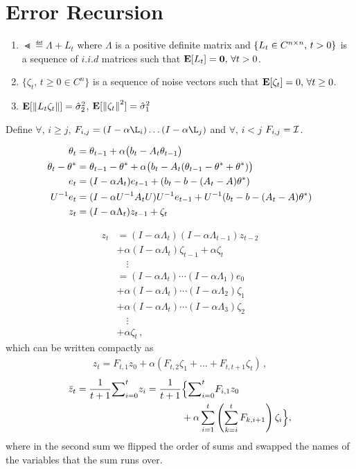 \section{Error Recursion}
\begin{assumption}\label{cmplxassmp}
\begin{enumerate}
\item $\Lt\eqdef \Lambda + L_t$ where $\Lambda$ is a positive definite matrix and $\{L_t \in C^{n\times n},\,t> 0\}$ is a sequence of $i.i.d$ matrices such that $\mathbf{E}[L_t]=\mathbf{0},\,\forall t>0$.
\item $\{\zeta_t,\,t\geq 0\in C^n\}$ is a sequence of noise vectors such that $\mathbf{E}[\zeta_t]=0,\,\forall t\geq 0$.
\item $\mathbf{E}[\left\| L_t \zeta_t\right\|]=\hat{\sigma}_2^2$, $\mathbf{E}[\left\| \zeta_t\right\|^2]=\hat{\sigma}_1^2$
\end{enumerate}
\end{assumption}

\begin{definition}
Define $\forall,\,i\geq j$, $F_{i,j}=(I-\alpha \L_i)\ldots (I-\alpha \L_j)$ and $\forall,\,i<j$ $F_{i,j}=\mathcal{I}$.
\end{definition}


\begin{align}
\theta_t&=\theta_{t-1}+\alpha\big(b_t-A_t\theta_{t-1}\big)\\
\theta_t-\theta^*&=\theta_{t-1}-\theta^*+\alpha\big(b_t-A_t(\theta_{t-1}-\theta^*+\theta^*)\big)\\
e_t&=(I-\alpha A_t)e_{t-1}+(b_t -b -(A_t-A)\theta^*)\\
U^{-1}e_t&=(I-\alpha U^{-1}A_t U) U^{-1}e_{t-1}+ U^{-1}(b_t -b -(A_t-A)\theta^*)\\
z_t&=(I-\alpha \Lambda_t) z_{t-1}+ \zeta_t
\end{align}


\begin{align*}
z_t
& = (I-\alpha \Lambda_t) (I-\alpha \Lambda_{t-1}) z_{t-2}\\ &+ \alpha (I-\alpha \Lambda_t) \zeta_{t-1} +\alpha \zeta_t \\
& \quad \vdots\\
& = (I-\alpha \Lambda_t) \cdots (I-\alpha \Lambda_1) e_0\\ &+ \alpha (I-\alpha \Lambda_t) \cdots (I-\alpha \Lambda_2) \zeta_1 \\
& + \alpha (I-\alpha \Lambda_t) \cdots (I-\alpha \Lambda_3) \zeta_2\\
&  \quad \vdots \\
&+ \alpha \zeta_t\,,
\end{align*}
which can be written compactly as
\begin{align}
\label{eq:etft}
z_t = F_{t,1} z_0 + \alpha (F_{t,2} \zeta_1 + \dots + F_{t,t+1} \zeta_t )\,,
\end{align}
\begin{align*}
\bar{z}_t=\frac{1}{t+1}{\sum}_{i=0}^{t}z_i
=\frac{1}{t+1}&\Big\{{\sum}_{i=0}^{t} F_{i,1} z_0 \\
&+ \alpha \sum_{i=1}^{t} \left(\sum_{k=i}^{t} F_{k,i+1} \right)\zeta_i \Big\} ,
\end{align*}
where in the second sum we flipped the order of sums and swapped the names of the variables that the sum runs over.

